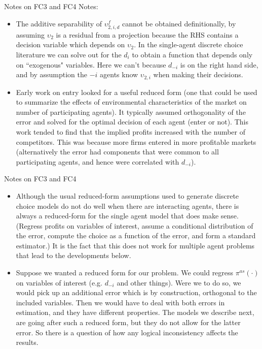 \documentclass[xcolor=pdftex,dvipsnames,table,mathserif]{beamer}
\begin{document}
\begin{frame}{Notes on FC3 and FC4}
Notes:

\small
\begin{itemize}

\item The additive separability of $\upsilon _{2,i,d}^{f}$ cannot be
obtained definitionally, by assuming $\upsilon _{2}$ is a residual from a
projection because the RHS contains a
decision variable which depends on $\upsilon _{2}$. In the single-agent discrete choice literature we can solve out for the $d_{i}$ to obtain a function that depends only on ``exogenous" variables.
Here we can't because $d_{-i}$ is on the right hand side,
and by assumption the $-i$ agents know $\upsilon _{2,i}$ when making their
decisions.
\item Early work on entry looked for a useful reduced form (one that could be used to summarize the effects of environmental characteristics of the market on number of participating agents). It typically assumed orthogonality of the error and solved for the optimal decision of each agent (enter or not). This work tended to find that the implied profits increased with the number of competitors. This was because more firms entered in more profitable markets (alternatively the error had components that were common to all participating agents, and hence were correlated with $d_{-i}$).
\end{itemize}
\end{frame}

\begin{frame}{Notes on FC3 and FC4}
\small
\begin{itemize}
\item Although the usual reduced-form assumptions used to generate discrete choice models do not do well when there are interacting agents, there is always a reduced-form for the single agent model that does make sense.  (Regress profits on variables of interest, assume a conditional distribution of the error, compute the choice as a function of the error, and form a standard estimator.)  It is the fact that this does not work for multiple agent problems that lead to the developments below.
\item Suppose we wanted a reduced form for our problem. We could regress $\pi^{as}(\cdot)$ on variables of interest (e.g. $d_{-i}$ and other things). Were we to do so, we would pick up an additional error which is by construction, orthogonal to the included variables. Then we would have to deal with both errors in estimation, and they have different properties. The models we describe next, are going after such a reduced form, but they do not allow for the latter error. So there is a question of how any logical inconsistency affects the results.
\end{itemize}
\end{frame}
\end{document}
